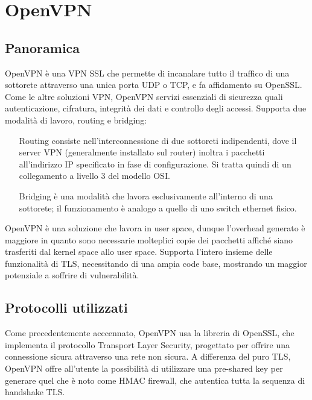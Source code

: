 \section{OpenVPN}
\subsection{Panoramica}
OpenVPN è una VPN SSL che permette di incanalare tutto il traffico di una sottorete attraverso una unica porta UDP o TCP, e fa affidamento su OpenSSL. Come le altre soluzioni VPN, OpenVPN servizi essenziali di sicurezza quali autenticazione, cifratura, integrità dei dati e controllo degli accessi.
Supporta due modalità di lavoro, routing e bridging:
\begin{itemize}
    \item[Routing] consiste nell'interconnessione di due sottoreti indipendenti, dove il server VPN (generalmente installato sul router) inoltra i pacchetti all'indirizzo IP specificato in fase di configurazione. Si tratta quindi di un collegamento a livello 3 del modello OSI.
    \item[Bridging] è una modalità che lavora esclusivamente all'interno di una sottorete; il funzionamento è analogo a quello di uno switch ethernet fisico.
\end{itemize}

OpenVPN è una soluzione che lavora in user space, dunque l'overhead generato è maggiore in quanto sono necessarie molteplici copie dei pacchetti affiché siano trasferiti dal kernel space allo user space. Supporta l'intero insieme delle funzionalità di TLS, necessitando di una ampia code base, mostrando un maggior potenziale a soffrire di vulnerabilità.

\subsection{Protocolli utilizzati}
Come precedentemente acccennato, OpenVPN usa la libreria di OpenSSL, che implementa il protocollo Transport Layer Security, progettato per offrire una connessione sicura attraverso una rete non sicura.
A differenza del puro TLS, OpenVPN offre all'utente la possibilità di utilizzare una pre-shared key per generare quel che è noto come HMAC firewall, che autentica tutta la sequenza di handshake TLS.

